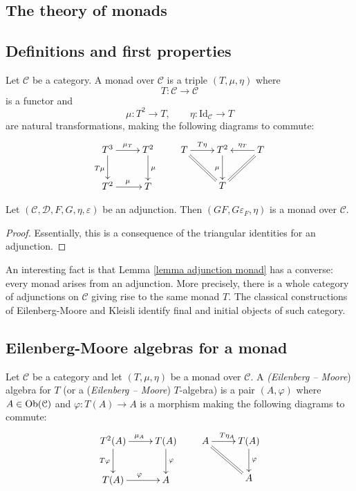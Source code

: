 \begin{refsection}
\section{The theory of monads}

\subsection{Definitions and first properties}

\begin{defin}
Let $\mathcal C$ be a category. A monad over $\mathcal C$ is a triple $(T, \mu, \eta)$ where
\[
T \colon \mathcal C \to \mathcal C
\]
is a functor and
\[
\mu \colon T^2 \to T, \qquad \eta \colon \mathrm{Id}_{\mathcal C} \to T
\]
are natural transformations, making the following diagrams to commute:
\[
\xymatrix{
T^3 \ar[r]^-{\mu_T} \ar[d]_{T \mu} & T^2 \ar[d]^\mu \\ T^2 \ar[r]^\mu & T
} \qquad
\xymatrix{
T \ar@{=}[dr] \ar[r]^-{T \eta} & T^2 \ar[d]_{\mu} & T \ar@{=}[dl] \ar[l]_-{\eta_T} \\ & T
}
\]
\end{defin}

\begin{lemma} \label{lemma adjunction monad}
Let $(\mathcal C, \mathcal D, F,G, \eta, \varepsilon)$ be an adjunction. Then $(GF, G \varepsilon_F, \eta)$ is a monad over $\mathcal C$.
\end{lemma}

\begin{proof}
Essentially, this is a consequence of the triangular identities for an adjunction.
\end{proof}

An interesting fact is that Lemma \ref{lemma adjunction monad} has a converse: every monad arises from an adjunction. More precisely, there is a whole category of adjunctions on $\mathcal C$ giving rise to the same monad $T$. The classical constructions of Eilenberg-Moore and Kleisli identify final and initial objects of such category.

\subsection{Eilenberg-Moore algebras for a monad}

\begin{defin} \label{def Eilenberg Moore algebras}
Let $\mathcal C$ be a category and let $(T, \mu, \eta)$ be a monad over $\mathcal C$. A \emph{ (Eilenberg -- Moore}) algebra for $T$ (or a (\emph{Eilenberg -- Moore}) $T$-algebra) is a pair $(A,\varphi)$ where $A \in \operatorname{Ob}(\mathcal C)$ and $\varphi \colon T(A) \to A$ is a morphism making the following diagrams to commute:
\[
\xymatrix{
T^2(A) \ar[r]^{\mu_A} \ar[d]_{T \varphi} & T(A) \ar[d]^{\varphi} \\ T(A) \ar[r]^{\varphi} & A
} \qquad
\xymatrix{
A \ar@{=}[dr] \ar[r]^{T \eta_A} & T(A) \ar[d]^{\varphi} \\ & A
}
\]
\end{defin}


\end{refsection}
